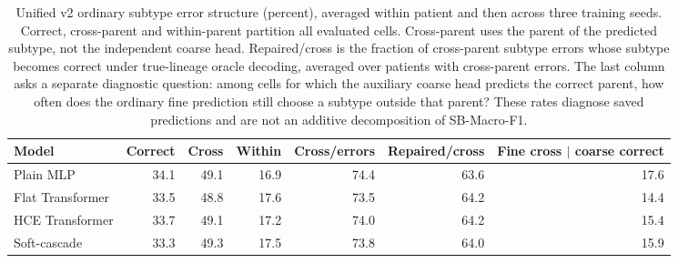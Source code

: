 \begin{table}[H]
\centering\small
\setlength{\tabcolsep}{3pt}
\begin{tabular}{lrrrrrr}
\toprule
Model & Correct & Cross & Within & Cross/errors & Repaired/cross & Fine cross $|$ coarse correct \\
\midrule
Plain MLP & 34.1 & 49.1 & 16.9 & 74.4 & 63.6 & 17.6 \\
Flat Transformer & 33.5 & 48.8 & 17.6 & 73.5 & 64.2 & 14.4 \\
HCE Transformer & 33.7 & 49.1 & 17.2 & 74.0 & 64.2 & 15.4 \\
Soft-cascade & 33.3 & 49.3 & 17.5 & 73.8 & 64.0 & 15.9 \\
\bottomrule
\end{tabular}
\caption{Unified v2 ordinary subtype error structure (percent), averaged
within patient and then across three training seeds. Correct, cross-parent
and within-parent partition all evaluated cells. Cross-parent uses the parent
of the predicted subtype, not the independent coarse head. Repaired/cross is
the fraction of cross-parent subtype errors whose subtype becomes correct
under true-lineage oracle decoding, averaged over patients with cross-parent
errors. The last column asks a separate diagnostic question: among cells for
which the auxiliary coarse head predicts the correct parent, how often does
the ordinary fine prediction still choose a subtype outside that parent?
These rates diagnose saved predictions and are not an additive decomposition
of SB-Macro-F1.}
\label{tab:v2_error_structure}
\end{table}
